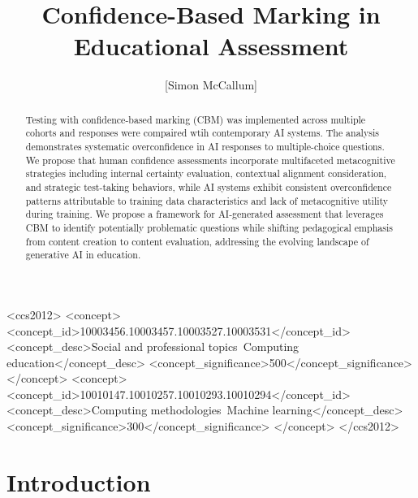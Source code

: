 \documentclass[sigconf]{acmart}
\begin{document}
\title{Confidence-Based Marking in Educational Assessment}

\author{[Simon McCallum]}

\begin{abstract}
  Testing with confidence-based marking (CBM) was implemented across multiple cohorts and responses were compaired wtih contemporary AI systems. The analysis demonstrates systematic overconfidence in AI responses to multiple-choice questions. We propose that human confidence assessments incorporate multifaceted metacognitive strategies including internal certainty evaluation, contextual alignment consideration, and strategic test-taking behaviors, while AI systems exhibit consistent overconfidence patterns attributable to training data characteristics and lack of metacognitive utility during training. We propose a framework for AI-generated assessment that leverages CBM to identify potentially problematic questions while shifting pedagogical emphasis from content creation to content evaluation, addressing the evolving landscape of generative AI in education.
\end{abstract}

\begin{CCSXML}
<ccs2012>
<concept>
<concept_id>10003456.10003457.10003527.10003531</concept_id>
<concept_desc>Social and professional topics~Computing education</concept_desc>
<concept_significance>500</concept_significance>
</concept>
<concept>
<concept_id>10010147.10010257.10010293.10010294</concept_id>
<concept_desc>Computing methodologies~Machine learning</concept_desc>
<concept_significance>300</concept_significance>
</concept>
</ccs2012>
\end{CCSXML}



\maketitle

\section{Introduction}
\end{document}
